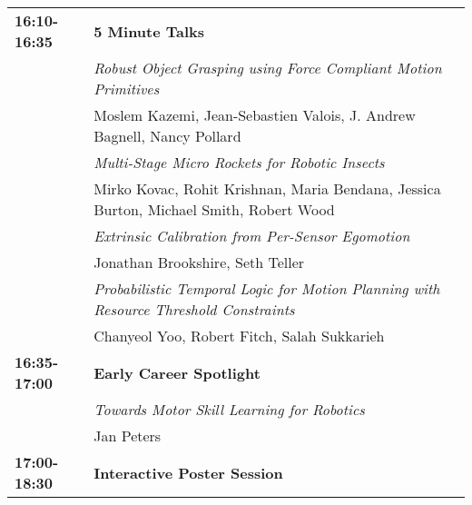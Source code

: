 \begin{tabular}{lp{13.8cm}}
{\bf 16:10-16:35} & {\bf 5 Minute Talks} \\[2mm]
& \em{ Robust Object Grasping using Force Compliant Motion Primitives}\\
& Moslem Kazemi\label{Kazemi}, Jean-Sebastien Valois, J. Andrew Bagnell, Nancy Pollard\\[2mm]
& \em{ Multi-Stage Micro Rockets for Robotic Insects}\\
& Mirko Kovac\label{Kovac}, Rohit Krishnan, Maria Bendana, Jessica Burton, Michael Smith, Robert Wood\\[2mm]
& \em{ Extrinsic Calibration from Per-Sensor Egomotion}\\
& Jonathan Brookshire\label{Brookshire}, Seth Teller\\[2mm]
& \em{ Probabilistic Temporal Logic for Motion Planning with Resource Threshold Constraints}\\
& Chanyeol Yoo\label{Yoo}, Robert Fitch, Salah Sukkarieh\\[2mm]


{\bf 16:35-17:00} & {\bf Early Career Spotlight} \\[2mm]
& \em{Towards Motor Skill Learning for Robotics}\\
& Jan Peters\\[2mm]

{\bf 17:00-18:30} & {\bf Interactive Poster Session} \\[2mm]
\end{tabular}


